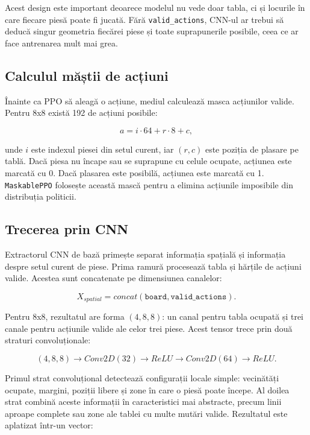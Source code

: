 \documentclass[12pt,a4paper]{article}
\begin{document}
Acest design este important deoarece modelul nu vede doar tabla, ci și locurile în care fiecare piesă poate fi jucată. Fără \texttt{valid\_actions}, CNN-ul ar trebui să deducă singur geometria fiecărei piese și toate suprapunerile posibile, ceea ce ar face antrenarea mult mai grea.

\subsection{Calculul măștii de acțiuni}

Înainte ca PPO să aleagă o acțiune, mediul calculează masca acțiunilor valide. Pentru 8x8 există 192 de acțiuni posibile:

\begin{equation}
    a = i \cdot 64 + r \cdot 8 + c,
\end{equation}

unde $i$ este indexul piesei din setul curent, iar $(r,c)$ este poziția de plasare pe tablă. Dacă piesa nu încape sau se suprapune cu celule ocupate, acțiunea este marcată cu 0. Dacă plasarea este posibilă, acțiunea este marcată cu 1. \texttt{MaskablePPO} folosește această mască pentru a elimina acțiunile imposibile din distribuția politicii.

\subsection{Trecerea prin CNN}

Extractorul CNN de bază primește separat informația spațială și informația despre setul curent de piese. Prima ramură procesează tabla și hărțile de acțiuni valide. Acestea sunt concatenate pe dimensiunea canalelor:

\begin{equation}
    X_{spatial} = concat(\texttt{board}, \texttt{valid\_actions}).
\end{equation}

Pentru 8x8, rezultatul are forma $(4,8,8)$: un canal pentru tabla ocupată și trei canale pentru acțiunile valide ale celor trei piese. Acest tensor trece prin două straturi convoluționale:

\begin{equation}
    (4,8,8) \rightarrow Conv2D(32) \rightarrow ReLU \rightarrow Conv2D(64) \rightarrow ReLU.
\end{equation}

Primul strat convoluțional detectează configurații locale simple: vecinătăți ocupate, margini, poziții libere și zone în care o piesă poate începe. Al doilea strat combină aceste informații în caracteristici mai abstracte, precum linii aproape complete sau zone ale tablei cu multe mutări valide. Rezultatul este aplatizat într-un vector:
\end{document}
